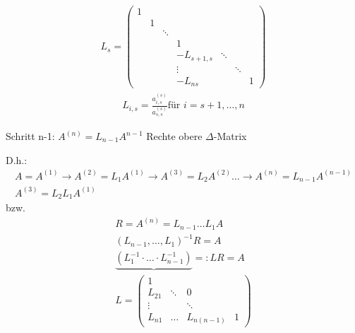 \begin{align*}
		L_s = \begin{pmatrix}
		      1 &   &        &            &        &        & \\
					  & 1 &        &            &        &        & \\
						&   & \ddots &            &        &        & \\
						&   &        & 1          &        &        & \\
						&   &        & -L_{s+1,s} & \ddots &        & \\
						&   &        & \vdots     &        & \ddots & \\
						&   &        & -L_{ns}    &        &        & 1
		      \end{pmatrix}
\end{align*}
\begin{align*}
  L_{i,s} = \frac{a_{i,s}^{(s)}}{a_{s,s}^{(s)}} \text{für } i = s + 1, \ldots, n
\end{align*}

Schritt n-1: $A^{\left(n\right)} = L_{n-1}A^{n-1}$
Rechte obere
$\Delta$-Matrix

D.h.: 
\begin{equation*}
  \begin{aligned}
A = A^{(1)} \rightarrow A^{(2)} = L_1A^{(1)} \rightarrow A^{(3)} = L_2A^{(2)} \ldots \rightarrow A^{(n)} = L_{n-1}A^{(n-1)} \\
A^{(3)} = L_2L_1A^{(1)}
  \end{aligned}
\end{equation*}
bzw.
\begin{equation*}
  \begin{aligned}
    R = A^{(n)} = L_{n-1} \ldots L_1 A  \\
		(L_{n-1}, \ldots, L_1)^{-1}R = A  \\
		\underbrace{(L_1^{-1} \cdot \ldots \cdot L_{n-1}^{-1})}{=:L}R = A  \\
		L = \begin{pmatrix}
		    1      &        &        &  \\
				L_{21} & \ddots & 0      &  \\
				\vdots &        & \ddots &  \\
				L_{n1} & \ldots & L_{n\left(n-1\right)} & 1
		    \end{pmatrix}
	\end{aligned}
\end{equation*}

